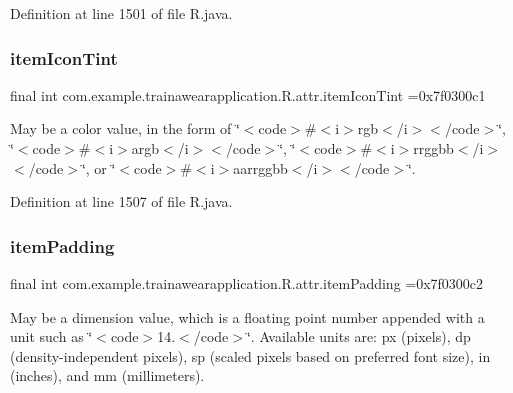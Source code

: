 Definition at line 1501 of file R.\+java.

\mbox{\label{classcom_1_1example_1_1trainawearapplication_1_1_r_1_1attr_aa887ec7a0af320b30f79dd996a18ea37}} 
\subsubsection{\texorpdfstring{itemIconTint}{itemIconTint}}
{\footnotesize\ttfamily final int com.\+example.\+trainawearapplication.\+R.\+attr.\+item\+Icon\+Tint =0x7f0300c1\hspace{0.3cm}{\ttfamily [static]}}

May be a color value, in the form of \char`\"{}$<$code$>$\#$<$i$>$rgb$<$/i$>$$<$/code$>$\char`\"{}, \char`\"{}$<$code$>$\#$<$i$>$argb$<$/i$>$$<$/code$>$\char`\"{}, \char`\"{}$<$code$>$\#$<$i$>$rrggbb$<$/i$>$$<$/code$>$\char`\"{}, or \char`\"{}$<$code$>$\#$<$i$>$aarrggbb$<$/i$>$$<$/code$>$\char`\"{}. 

Definition at line 1507 of file R.\+java.

\mbox{\label{classcom_1_1example_1_1trainawearapplication_1_1_r_1_1attr_a6b6da39404562545f9f51cf78522189c}} 
\subsubsection{\texorpdfstring{itemPadding}{itemPadding}}
{\footnotesize\ttfamily final int com.\+example.\+trainawearapplication.\+R.\+attr.\+item\+Padding =0x7f0300c2\hspace{0.3cm}{\ttfamily [static]}}

May be a dimension value, which is a floating point number appended with a unit such as \char`\"{}$<$code$>$14.\+5sp$<$/code$>$\char`\"{}. Available units are\+: px (pixels), dp (density-\/independent pixels), sp (scaled pixels based on preferred font size), in (inches), and mm (millimeters). 

